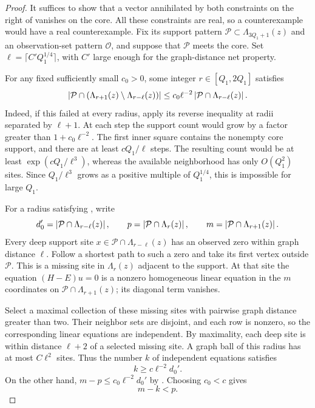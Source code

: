 \begin{proof}
It suffices to show that a vector annihilated by both constraints on the
right of  vanishes on the core.
All these constraints are real, so a counterexample would have a real
counterexample. Fix its support pattern
$\mathcal P\subset\Lambda_{3Q_1+1}(z)$ and an observation-set pattern
$\mathcal O$, and suppose that $\mathcal P$ meets the core.
Set $\ell=\lceil C'Q_1^{1/4}\rceil$, with $C'$ large enough for the
graph-distance net property.

For any fixed sufficiently small $c_0>0$, some integer
$r\in[Q_1,2Q_1]$ satisfies
\begin{equation}
 \left\lvert\mathcal P\cap
       (\Lambda_{r+1}(z)\setminus\Lambda_{r-\ell}(z))\right\rvert
 \leq c_0\ell^{-2}
       \left\lvert\mathcal P\cap\Lambda_{r-\ell}(z)\right\rvert.
 \label{screen:thin-support-annulus}
\end{equation}
Indeed, if this failed at every radius, apply its reverse inequality at
radii separated by $\ell+1$. At each step the support count would grow
by a factor greater than $1+c_0\ell^{-2}$. The first inner square
contains the nonempty core support, and there are at least
$cQ_1/\ell$ steps. The resulting count would be at least
$\exp(cQ_1/\ell^3)$, whereas the available neighborhood has only
$O(Q_1^2)$ sites. Since $Q_1/\ell^3$ grows as a positive multiple of
$Q_1^{1/4}$, this is impossible for large $Q_1$.

For a radius satisfying , write
\[
 d_0'=\left\lvert\mathcal P\cap\Lambda_{r-\ell}(z)\right\rvert,\qquad
 p=\left\lvert\mathcal P\cap\Lambda_r(z)\right\rvert,\qquad
 m=\left\lvert\mathcal P\cap\Lambda_{r+1}(z)\right\rvert.
\]
Every deep support site $x\in\mathcal P\cap\Lambda_{r-\ell}(z)$ has
an observed zero within graph distance $\ell$. Follow a shortest path
to such a zero and take its first vertex outside $\mathcal P$.
This is a missing site in $\Lambda_r(z)$ adjacent to the support.
At that site the equation $(H-E)u=0$ is a nonzero homogeneous linear
equation in the $m$ coordinates on
$\mathcal P\cap\Lambda_{r+1}(z)$; its diagonal term vanishes.

Select a maximal collection of these missing sites with pairwise graph
distance greater than two. Their neighbor sets are disjoint, and each
row is nonzero, so the corresponding linear equations are independent.
By maximality, each deep site is within distance $\ell+2$ of a selected
missing site. A graph ball of this radius has at most $C\ell^2$ sites.
Thus the number $k$ of independent equations satisfies
\[
 k\geq c\ell^{-2}d_0'.
\]
On the other hand,
$m-p\leq c_0\ell^{-2}d_0'$ by
. Choosing $c_0<c$ gives
\begin{equation}
 m-k<p.
 \label{screen:dimension-count}
\end{equation}


\end{proof}
